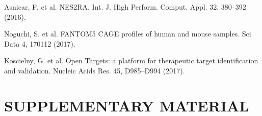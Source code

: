 \documentclass[fleqn,10pt]{SelfArx} %
\begin{document}


\begin{thebibliography}{1}
	
	 Asnicar, F. et al. NES2RA. Int. J. High Perform. Comput. Appl. 32, 380–392 (2016).
	
	
	 Noguchi, S. et al. FANTOM5 CAGE profiles of human and mouse samples. Sci Data 4, 170112 (2017).
	
	
	 Koscielny, G. et al. Open Targets: a platform for therapeutic target identification and validation. Nucleic Acids Res. 45, D985–D994 (2017).
	
	
\end{thebibliography}


\pagebreak
\onecolumn

\section*{SUPPLEMENTARY MATERIAL}
\renewcommand{\arraystretch}{1.05}
\end{document}
